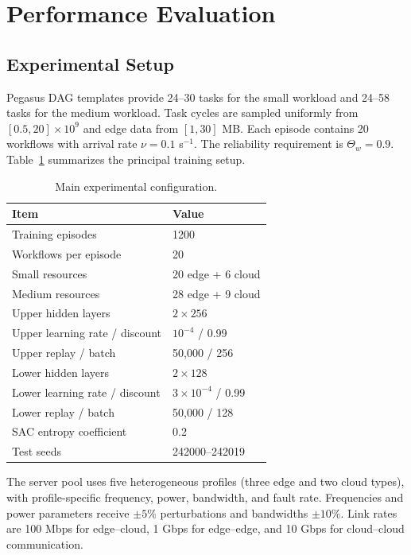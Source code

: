\documentclass[lettersize,journal]{IEEEtran}
\begin{document}
\section{Performance Evaluation}
\label{sec:evaluation}

\subsection{Experimental Setup}
Pegasus DAG templates provide 24--30 tasks for the small workload and 24--58
tasks for the medium workload. Task cycles are sampled uniformly from
$[0.5,20]\times10^9$ and edge data from $[1,30]$ MB. Each episode contains 20
workflows with arrival rate $\nu=0.1$ s$^{-1}$. The reliability requirement is
$\Theta_w=0.9$. Table~\ref{tab:setup} summarizes the principal training setup.

\begin{table}[t]
\centering
\caption{Main experimental configuration.}
\label{tab:setup}
\renewcommand{\arraystretch}{1.05}
\begin{tabular}{@{}ll@{}}
\toprule
Item & Value \\
\midrule
Training episodes & 1200 \\
Workflows per episode & 20 \\
Small resources & 20 edge + 6 cloud \\
Medium resources & 28 edge + 9 cloud \\
Upper hidden layers & $2\times256$ \\
Upper learning rate / discount & $10^{-4}$ / 0.99 \\
Upper replay / batch & 50,000 / 256 \\
Lower hidden layers & $2\times128$ \\
Lower learning rate / discount & $3\times10^{-4}$ / 0.99 \\
Lower replay / batch & 50,000 / 128 \\
SAC entropy coefficient & 0.2 \\
Test seeds & 242000--242019 \\
\bottomrule
\end{tabular}
\end{table}

The server pool uses five heterogeneous profiles (three edge and two cloud
types), with profile-specific frequency, power, bandwidth, and fault rate.
Frequencies and power parameters receive $\pm5\%$ perturbations and bandwidths
$\pm10\%$. Link rates are 100 Mbps for edge--cloud, 1 Gbps for edge--edge, and
10 Gbps for cloud--cloud communication.
\end{document}

